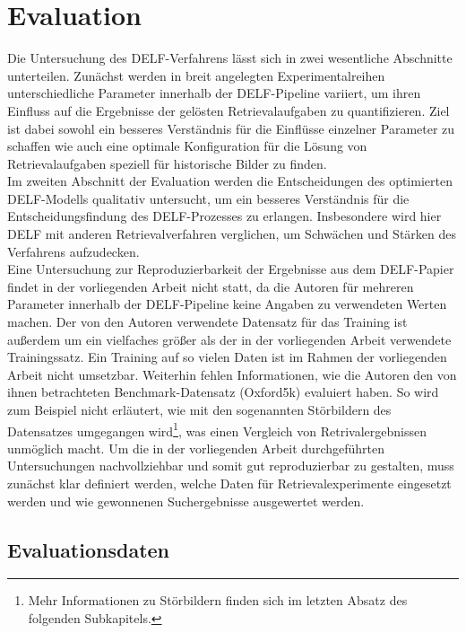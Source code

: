 \chapter{Evaluation}

Die Untersuchung des DELF-Verfahrens lässt sich in zwei wesentliche Abschnitte unterteilen. Zunächst werden in breit angelegten Experimentalreihen unterschiedliche Parameter innerhalb der DELF-Pipeline variiert, um ihren Einfluss auf die Ergebnisse der gelösten Retrievalaufgaben zu quantifizieren. Ziel ist dabei sowohl ein besseres Verständnis für die Einflüsse einzelner Parameter zu schaffen wie auch eine optimale Konfiguration für die Lösung von Retrievalaufgaben speziell für historische Bilder zu finden. \\
Im zweiten Abschnitt der Evaluation werden die Entscheidungen des optimierten DELF-Modells qualitativ untersucht, um ein besseres Verständnis für die Entscheidungsfindung des DELF-Prozesses zu erlangen. Insbesondere wird hier DELF mit anderen Retrievalverfahren verglichen, um Schwächen und Stärken des Verfahrens aufzudecken. \\
Eine Untersuchung zur Reproduzierbarkeit der Ergebnisse aus dem DELF-Papier \cite{delf} findet in der vorliegenden Arbeit nicht statt, da die Autoren für mehreren Parameter innerhalb der DELF-Pipeline keine Angaben zu verwendeten Werten machen. Der von den Autoren verwendete Datensatz für das Training ist außerdem um ein vielfaches größer als der in der vorliegenden Arbeit verwendete Trainingssatz. Ein Training auf so vielen Daten ist im Rahmen der vorliegenden Arbeit nicht umsetzbar. Weiterhin fehlen Informationen, wie die Autoren den von ihnen betrachteten Benchmark-Datensatz (Oxford5k) evaluiert haben. So wird zum Beispiel nicht erläutert, wie mit den sogenannten Störbildern des Datensatzes umgegangen wird\footnote{Mehr Informationen zu Störbildern finden sich im letzten Absatz des folgenden Subkapitels.}, was einen Vergleich von Retrivalergebnissen unmöglich macht. Um die in der vorliegenden Arbeit durchgeführten Untersuchungen nachvollziehbar und somit gut reproduzierbar zu gestalten, muss zunächst klar definiert werden, welche Daten für Retrievalexperimente eingesetzt werden und wie gewonnenen Suchergebnisse ausgewertet werden. 
\section{Evaluationsdaten}

